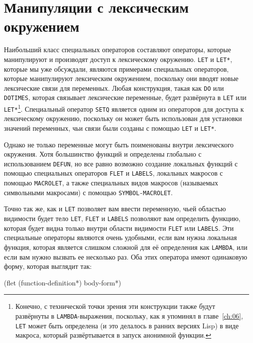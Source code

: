 \section{Манипуляции с лексическим окружением}

Наибольший класс специальных операторов составляют операторы, которые манипулируют и
производят доступ к лексическому окружению. \lstinline{LET} и \lstinline{LET*}, которые мы уже
обсуждали, являются примерами специальных операторов, которые манипулируют лексическим
окружением, поскольку они вводят новые лексические связи для переменных.  Любая
конструкция, такая как \lstinline{DO} или \lstinline{DOTIMES}, которая связывает лексические
переменные, будет развёрнута в \lstinline{LET} или \lstinline{LET*}\footnote{Конечно, с технической
  точки зрения эти конструкции также будут развёрнуты в \lstinline{LAMBDA}-выражения,
  поскольку, как я упоминял в главе~\ref{ch:06}, \lstinline{LET} может быть определена (и это
делалось в ранних версиях Lisp) в виде макроса, который развёртывается в запуск анонимной
функции.}. Специальный оператор \lstinline{SETQ} является одним из операторов для доступа к
лексическому окружению, поскольку он может быть использован для установки значений
переменных, чьи связи были созданы с помощью \lstinline{LET} и \lstinline{LET*}.

Однако не только переменные могут быть поименованы внутри лексического окружения.  Хотя
большинство функций и определены глобально с использованием \lstinline{DEFUN}, но все равно
возможно создание локальных функций с помощью специальных операторов \lstinline{FLET} и
\lstinline{LABELS}, локальных макросов с помощью \lstinline{MACROLET}, а также специальных видов
макросов (называемых символьными макросами) с помощью \lstinline{SYMBOL-MACROLET}.

Точно так же, как и \lstinline{LET} позволяет вам ввести переменную, чьей областью видимости
будет тело \lstinline{LET}, \lstinline{FLET} и \lstinline{LABELS} позволяют вам определить функцию,
которая будет видна только внутри области видимости \lstinline{FLET} или \lstinline{LABELS}.  Эти
специальные операторы являются очень удобными, если вам нужна локальная функция, которая
является слишком сложной для её определения как \lstinline{LAMBDA}, или если вам нужно вызвать
ее несколько раз.  Оба этих оператора имеют одинаковую форму, которая выглядит так:

\begin{myverb}
(flet (function-definition*)
  body-form*)
\end{myverb}

